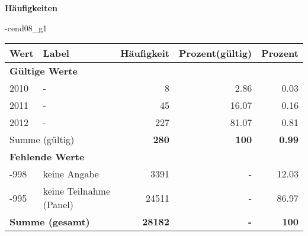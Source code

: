         		\vspace*{0.5cm}
                \noindent\textbf{Häufigkeiten}

                \vspace*{-\baselineskip}
					\begin{filecontents}{\jobname-cend08_g1}
					\begin{longtable}{lXrrr}
					\toprule
					\textbf{Wert} & \textbf{Label} & \textbf{Häufigkeit} & \textbf{Prozent(gültig)} & \textbf{Prozent} \\
					\endhead
					\midrule
					\multicolumn{5}{l}{\textbf{Gültige Werte}}\\

					2010 &
					\multicolumn{1}{X}{ -  } &


					  \num{8} &
					  \num[round-mode=places,round-precision=2]{2,86} &
					    \num[round-mode=places,round-precision=2]{0,03} \\

					2011 &
					\multicolumn{1}{X}{ -  } &


					  \num{45} &
					  \num[round-mode=places,round-precision=2]{16,07} &
					    \num[round-mode=places,round-precision=2]{0,16} \\

					2012 &
					\multicolumn{1}{X}{ -  } &


					  \num{227} &
					  \num[round-mode=places,round-precision=2]{81,07} &
					    \num[round-mode=places,round-precision=2]{0,81} \\
					\midrule
					\multicolumn{2}{l}{Summe (gültig)} &
					  \textbf{\num{280}} &
					\textbf{100} &
					  \textbf{\num[round-mode=places,round-precision=2]{0,99}} \\
					\multicolumn{5}{l}{\textbf{Fehlende Werte}}\\
							-998 &
							keine Angabe &
							  \num{3391} &
							 - &
							  \num[round-mode=places,round-precision=2]{12,03} \\
							-995 &
							keine Teilnahme (Panel) &
							  \num{24511} &
							 - &
							  \num[round-mode=places,round-precision=2]{86,97} \\
					\midrule
					\multicolumn{2}{l}{\textbf{Summe (gesamt)}} &
				      \textbf{\num{28182}} &
				    \textbf{-} &
				    \textbf{100} \\
					\bottomrule
					\end{longtable}
					\end{filecontents}
